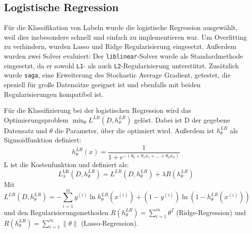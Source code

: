 \subsection{Logistische Regression}

Für die Klassifikation von Labeln wurde die logistische Regression ausgewählt, weil dies insbesondere schnell und einfach zu implementieren war. Um Overfitting zu verhindern, wurden Lasso und Ridge Regularisierung eingesetzt. Außerdem wurden zwei Solver evaluiert: Der \texttt{liblinear}-Solver wurde als Standardmethode eingesetzt, da er sowohl \texttt{L1}- als auch \texttt{L2}-Regularisierung unterstützt. Zusätzlich wurde \texttt{saga}, eine Erweiterung des Stochastic Average Gradient, getestet, die speziell für große Datensätze geeignet ist und ebenfalls mit beiden Regularisierungen kompatibel ist.

Für die Klassifizierung bei der logistischen Regression wird das Optimierungsproblem $\min_\theta L^{LR}(D,h^{LR}_\theta)$ gelöst. Dabei ist D der gegebene Datensatz und $\theta$ die Parameter, über die optimiert wird. Außerdem ist $h_\theta^{LR}$ als Sigmoidfunktion definiert:
\begin{equation*}
    h_\theta^{LR}(x) = \frac{1}{1 + e^{-(\theta_0 + \theta_1 x_1 + \dots + \theta_n x_n)}}
\end{equation*}
L ist die Kostenfunktion und definiert als:
\begin{equation*}
    L_\lambda^{\text{LR}}(D, h^{LR}_\theta)=L^{LR}(D,h^{LR}_\theta)+\lambda R(h^{LR}_\theta) 
\end{equation*}
Mit
\begin{equation*}
     L^{LR}(D,h^{LR}_\theta)=- \sum_{i=1}^{m}  y^{(i)} \ln h^{LR}_\theta(x^{(i)}) + (1 - y^{(i)}) \ln (1 - h^{LR}_\theta(x^{(i)}))
\end{equation*}
und den Regularisierungsmethoden $R(h^{LR}_\theta)=\sum_{i=1}^m\theta^2$ (Ridge-Regression) und $ R(h^{LR}_\theta)=\sum_{i=1}^m\|\theta\|$ (Lasso-Regression).
